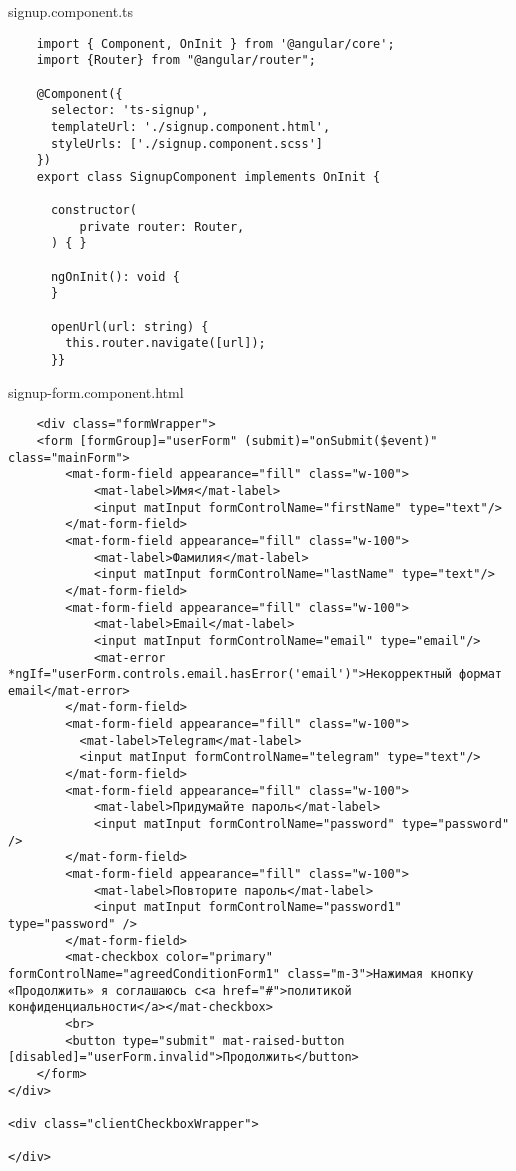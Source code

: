 signup.component.ts
\begin{lstlisting}
    import { Component, OnInit } from '@angular/core';
    import {Router} from "@angular/router";
    
    @Component({
      selector: 'ts-signup',
      templateUrl: './signup.component.html',
      styleUrls: ['./signup.component.scss']
    })
    export class SignupComponent implements OnInit {
    
      constructor(
          private router: Router,
      ) { }
    
      ngOnInit(): void {
      }
    
      openUrl(url: string) {
        this.router.navigate([url]);
      }}
\end{lstlisting}

signup-form.component.html
\begin{lstlisting}
    <div class="formWrapper">
    <form [formGroup]="userForm" (submit)="onSubmit($event)" class="mainForm">
        <mat-form-field appearance="fill" class="w-100">
            <mat-label>Имя</mat-label>
            <input matInput formControlName="firstName" type="text"/>
        </mat-form-field>
        <mat-form-field appearance="fill" class="w-100">
            <mat-label>Фамилия</mat-label>
            <input matInput formControlName="lastName" type="text"/>
        </mat-form-field>
        <mat-form-field appearance="fill" class="w-100">
            <mat-label>Email</mat-label>
            <input matInput formControlName="email" type="email"/>
            <mat-error *ngIf="userForm.controls.email.hasError('email')">Некорректный формат email</mat-error>
        </mat-form-field>
        <mat-form-field appearance="fill" class="w-100">
          <mat-label>Telegram</mat-label>
          <input matInput formControlName="telegram" type="text"/>
        </mat-form-field>
        <mat-form-field appearance="fill" class="w-100">
            <mat-label>Придумайте пароль</mat-label>
            <input matInput formControlName="password" type="password" />
        </mat-form-field>
        <mat-form-field appearance="fill" class="w-100">
            <mat-label>Повторите пароль</mat-label>
            <input matInput formControlName="password1" type="password" />
        </mat-form-field>
        <mat-checkbox color="primary" formControlName="agreedConditionForm1" class="m-3">Нажимая кнопку «Продолжить» я соглашаюсь с<a href="#">политикой конфиденциальности</a></mat-checkbox>
        <br>
        <button type="submit" mat-raised-button [disabled]="userForm.invalid">Продолжить</button>
    </form>
</div>

<div class="clientCheckboxWrapper">

</div>
\end{lstlisting}


